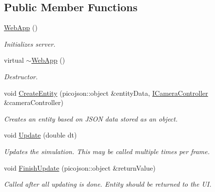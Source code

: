 \subsection*{Public Member Functions}
\begin{DoxyCompactItemize}
\item 
\mbox{\label{classWebApp_a9ba424099f42bdd456f52c4bba87d5b2}} 
\hyperlink{classWebApp_a9ba424099f42bdd456f52c4bba87d5b2}{Web\+App} ()
\begin{DoxyCompactList}\small\item\em Initializes server. \end{DoxyCompactList}\item 
\mbox{\label{classWebApp_aea8764197ebbcd256a07055b187a7fa8}} 
virtual \hyperlink{classWebApp_aea8764197ebbcd256a07055b187a7fa8}{$\sim$\+Web\+App} ()
\begin{DoxyCompactList}\small\item\em Destructor. \end{DoxyCompactList}\item 
\mbox{\label{classWebApp_aa75704c331471269090aff776bf70c66}} 
void \hyperlink{classWebApp_aa75704c331471269090aff776bf70c66}{Create\+Entity} (picojson\+::object \&entity\+Data, \hyperlink{classICameraController}{I\+Camera\+Controller} \&camera\+Controller)
\begin{DoxyCompactList}\small\item\em Creates an entity based on J\+S\+ON data stored as an object. \end{DoxyCompactList}\item 
\mbox{\label{classWebApp_a422feda1eac97b1aa1f69243387498c2}} 
void \hyperlink{classWebApp_a422feda1eac97b1aa1f69243387498c2}{Update} (double dt)
\begin{DoxyCompactList}\small\item\em Updates the simulation. This may be called multiple times per frame. \end{DoxyCompactList}\item 
\mbox{\label{classWebApp_ac7731245815aefcff7023a4dd10995ea}} 
void \hyperlink{classWebApp_ac7731245815aefcff7023a4dd10995ea}{Finish\+Update} (picojson\+::object \&return\+Value)
\begin{DoxyCompactList}\small\item\em Called after all updating is done. Entity should be returned to the UI. \end{DoxyCompactList}\item 

\end{DoxyCompactItemize}
